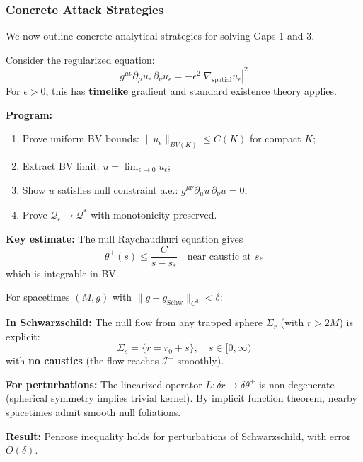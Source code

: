 \subsubsection{Concrete Attack Strategies}

We now outline concrete analytical strategies for solving Gaps 1 and 3.

\begin{remark}
Consider the regularized equation:
\begin{equation}
\label{eq:elliptic-regularization}
g^{\mu\nu} \partial_\mu u_\epsilon \, \partial_\nu u_\epsilon = -\epsilon^2 |\nabla_{\text{spatial}} u_\epsilon|^2
\end{equation}
For $\epsilon > 0$, this has \textbf{timelike} gradient and standard existence theory applies.

\textbf{Program:}
\begin{enumerate}[label=(\roman*)]
\item Prove uniform BV bounds: $\|u_\epsilon\|_{BV(K)} \leq C(K)$ for compact $K$;
\item Extract BV limit: $u = \lim_{\epsilon \to 0} u_\epsilon$;
\item Show $u$ satisfies null constraint a.e.: $g^{\mu\nu}\partial_\mu u \, \partial_\nu u = 0$;
\item Prove $\mathcal{Q}_\epsilon \to \mathcal{Q}^*$ with monotonicity preserved.
\end{enumerate}

\textbf{Key estimate:} The null Raychaudhuri equation gives
$$\theta^+(s) \leq \frac{C}{s - s_*} \quad \text{near caustic at } s_*$$
which is integrable in BV.
\end{remark}

\begin{remark}
For spacetimes $(M, g)$ with $\|g - g_{\text{Schw}}\|_{C^3} < \delta$:

\textbf{In Schwarzschild:} The null flow from any trapped sphere $\Sigma_r$ (with $r > 2M$) is explicit:
$$\Sigma_s = \{r = r_0 + s\}, \quad s \in [0, \infty)$$
with \textbf{no caustics} (the flow reaches $\mathscr{I}^+$ smoothly).

\textbf{For perturbations:} The linearized operator $L: \delta r \mapsto \delta\theta^+$ is non-degenerate (spherical symmetry implies trivial kernel). By implicit function theorem, nearby spacetimes admit smooth null foliations.

\textbf{Result:} Penrose inequality holds for perturbations of Schwarzschild, with error $O(\delta)$.
\end{remark}

